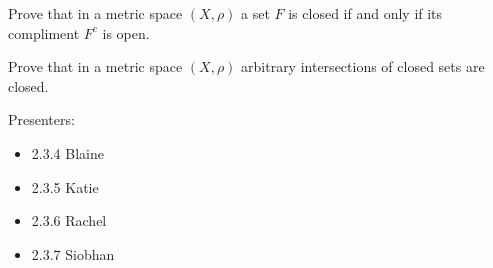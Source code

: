 \begin{problem*}
Prove that in a metric space $(X,\rho)$ a set $F$ is closed if and only if its compliment $F^c$ is open.

\end{problem*}
\begin{problem*}
Prove that in a metric space $(X,\rho)$ arbitrary intersections of closed sets are closed.
\end{problem*}
Presenters:
\begin{itemize}
\item 2.3.4  Blaine
\item 2.3.5  Katie
\item 2.3.6  Rachel
\item 2.3.7  Siobhan
\end{itemize}


